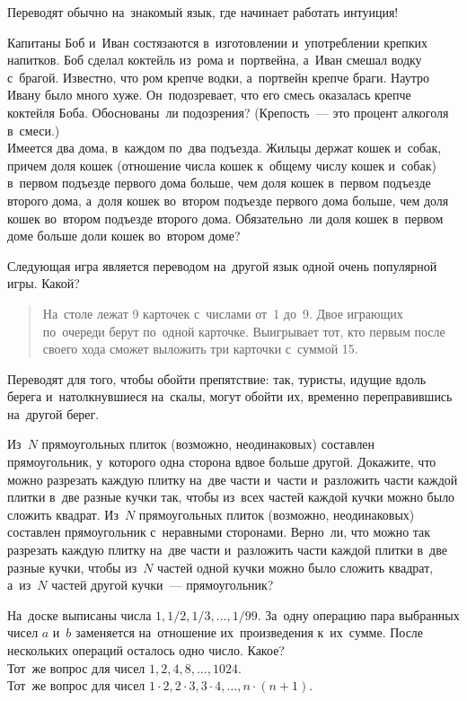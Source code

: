Переводят обычно на~знакомый язык, где начинает работать интуиция!

\begin{problems}

\item
\sp
Капитаны Боб и~Иван состязаются в~изготовлении и~употреблении крепких напитков.
Боб сделал коктейль из~рома и~портвейна, а~Иван смешал водку с~брагой.
Известно, что ром крепче водки, а~портвейн крепче браги.
Наутро Ивану было много хуже.
Он~подозревает, что его смесь оказалась крепче коктейля Боба.
Обоснованы~ли подозрения?
(Крепость~--- это процент алкоголя в~смеси.)
\\
\sp
Имеется два дома, в~каждом по~два подъезда.
Жильцы держат кошек и~собак, причем доля кошек (отношение числа кошек к~общему
числу кошек и~собак) в~первом подъезде первого дома больше, чем доля кошек
в~первом подъезде второго дома, а~доля кошек во~втором подъезде первого дома
больше, чем доля кошек во~втором подъезде второго дома.
Обязательно~ли доля кошек в~первом доме больше доли кошек во~втором доме?

\item
Следующая игра является переводом на~другой язык одной очень популярной игры.
Какой?
\begin{quote}
На~столе лежат 9 карточек с~числами от~1 до~9.
Двое играющих по~очереди берут по~одной карточке.
Выигрывает тот, кто первым после своего хода сможет выложить три карточки
с~суммой 15.
\end{quote}

\end{problems}

Переводят для того, чтобы обойти препятствие: так, туристы, идущие вдоль берега
и~натолкнувшиеся на~скалы, могут обойти их, временно переправившись на~другой
берег.

\begin{problems}

\item
\sp
Из~$N$ прямоугольных плиток (возможно, неодинаковых) составлен прямоугольник,
у~которого одна сторона вдвое больше другой.
Докажите, что можно разрезать каждую плитку на~две части и~части и~разложить
части каждой плитки в~две разные кучки так, чтобы из~всех частей каждой кучки
можно было сложить квадрат.
\sp
Из~$N$ прямоугольных плиток (возможно, неодинаковых) составлен прямоугольник
с~неравными сторонами.
Верно~ли, что можно так разрезать каждую плитку на~две части и~разложить части
каждой плитки в~две разные кучки, чтобы из~$N$ частей одной кучки можно было
сложить квадрат, а~из~$N$ частей другой кучки~--- прямоугольник?

\item
\sp
На~доске выписаны числа $1, 1/2, 1/3, \ldots, 1/99$.
За~одну операцию пара выбранных чисел $a$ и~$b$ заменяется на~отношение
их~произведения к~их~сумме.
После нескольких операций осталось одно число.
Какое?
\\
\sp
Тот~же вопрос для чисел $1, 2, 4, 8, \ldots, 1024$.
\\
\sp
Тот~же вопрос для чисел
$1 \cdot 2, 2 \cdot 3, 3 \cdot 4, \ldots, n \cdot (n + 1)$.

\end{problems}

